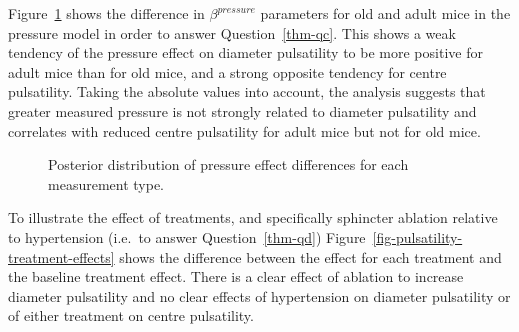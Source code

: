 \documentclass[
  letterpaper,
  DIV=11,
  numbers=noendperiod,
  oneside]{scrartcl}
\theoremstyle{plain}
\theoremstyle{remark}
\begin{document}
Figure~\ref{fig-pulsatility-pressure-effects} shows the difference in
\(\beta^{pressure}\) parameters for old and adult mice in the pressure
model in order to answer Question~\ref{thm-qc}. This shows a weak
tendency of the pressure effect on diameter pulsatility to be more
positive for adult mice than for old mice, and a strong opposite
tendency for centre pulsatility. Taking the absolute values into
account, the analysis suggests that greater measured pressure is not
strongly related to diameter pulsatility and correlates with reduced
centre pulsatility for adult mice but not for old mice.

\begin{figure}


\caption{\label{fig-pulsatility-pressure-effects}Posterior distribution
of pressure effect differences for each measurement type.}

\end{figure}%

To illustrate the effect of treatments, and specifically sphincter
ablation relative to hypertension (i.e.~to answer Question~\ref{thm-qd})
Figure~\ref{fig-pulsatility-treatment-effects} shows the difference
between the effect for each treatment and the baseline treatment effect.
There is a clear effect of ablation to increase diameter pulsatility and
no clear effects of hypertension on diameter pulsatility or of either
treatment on centre pulsatility.
\end{document}
